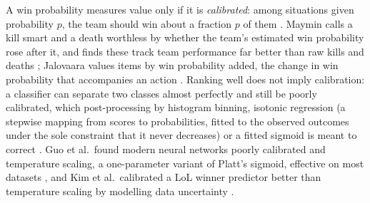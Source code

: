 A win probability measures value only if it is \emph{calibrated}: among situations given
probability $p$, the team should win about a fraction $p$ of them \cite{naeini2015obtaining}.
Maymin calls a kill smart and a death worthless by whether the team's estimated win
probability rose after it, and finds these track team performance far better than raw kills and deaths
\cite{maymin2021smart}; Jalovaara values items by win probability added, the change in win probability
that accompanies an action \cite{jalovaara2024win}.
Ranking well does not imply calibration: a classifier can separate two classes almost perfectly and
still be poorly calibrated, which post-processing by histogram binning, isotonic regression (a stepwise
mapping from scores to probabilities, fitted to the observed outcomes under the sole constraint that it
never decreases) or a
fitted sigmoid \cite{platt2000probabilities} is meant to correct \cite{naeini2015obtaining}. Guo et
al.\ found modern neural networks poorly calibrated and temperature scaling, a one-parameter variant
of Platt's sigmoid, effective on most datasets \cite{guo2017calibration}, and Kim et al.\ calibrated a
LoL winner predictor better than temperature scaling by modelling data uncertainty
\cite{kim2020confidence}.
